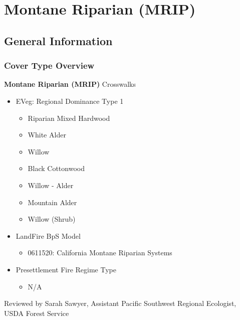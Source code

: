 \newpage
\section{Montane Riparian (MRIP)}
\label{mrip-description}

\subsection*{General Information}

\subsubsection{Cover Type Overview}

\textbf{Montane Riparian (MRIP)}
\newline
Crosswalks
\begin{itemize}
	\item EVeg: Regional Dominance Type 1
	\begin{itemize}
		\item Riparian Mixed Hardwood
		\item White Alder
		\item Willow
		\item Black Cottonwood
		\item Willow - Alder
		\item Mountain Alder
		\item Willow (Shrub)
	\end{itemize}

	\item LandFire BpS Model
	\begin{itemize}
		\item 0611520: California Montane Riparian Systems 
	\end{itemize}

	\item Presettlement Fire Regime Type
	\begin{itemize}
		\item N/A
	\end{itemize}
\end{itemize}

\noindent Reviewed by Sarah Sawyer, Assistant Pacific Southwest Regional Ecologist, USDA Forest Service

